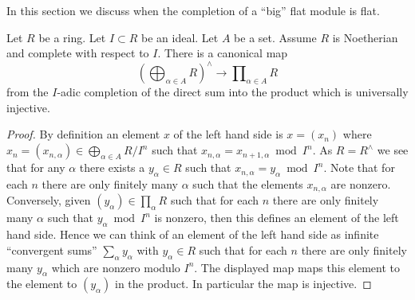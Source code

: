 \noindent
In this section we discuss when the completion of a ``big'' flat module
is flat.

\begin{lemma}
\label{lemma-ui-completion-direct-sum-into-product}
Let $R$ be a ring.
Let $I \subset R$ be an ideal.
Let $A$ be a set.
Assume $R$ is Noetherian and complete with respect to $I$. There is a
canonical map
$$
\left(\bigoplus\nolimits_{\alpha \in A} R\right)^\wedge
\longrightarrow
\prod\nolimits_{\alpha \in A} R
$$
from the $I$-adic completion of the direct sum into the product
which is universally injective.
\end{lemma}

\begin{proof}
By definition an element $x$ of the left hand side is $x = (x_n)$ where
$x_n = (x_{n, \alpha}) \in \bigoplus\nolimits_{\alpha \in A} R/I^n$
such that $x_{n, \alpha} = x_{n + 1, \alpha} \bmod I^n$.
As $R = R^\wedge$ we see that for any $\alpha$ there exists a $y_\alpha \in R$
such that $x_{n, \alpha} = y_\alpha \bmod I^n$. Note that for each $n$ there
are only finitely many $\alpha$ such that the elements $x_{n, \alpha}$ are
nonzero. Conversely, given $(y_\alpha) \in \prod_\alpha R$ such that for each
$n$ there are only finitely many $\alpha$ such that $y_{\alpha} \bmod I^n$
is nonzero, then this defines an element of the left hand side.
Hence we can think of an element of the left hand side as infinite
``convergent sums'' $\sum_\alpha y_\alpha$ with $y_\alpha \in R$
such that for each $n$ there are only finitely many $y_\alpha$
which are nonzero modulo $I^n$. The displayed map maps this element
to the element to $(y_\alpha)$ in the product.
In particular the map is injective.


\end{proof}
